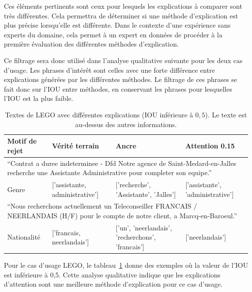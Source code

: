 Ces éléments pertinents sont ceux pour lesquels les explications à comparer sont très différentes.
Cela permettra de déterminer si une méthode d'explication est plus précise lorsqu'elle est différente.
Dans le contexte d'une expérience sans experts du domaine, cela permet à un expert en données de procéder à la première évaluation des différentes méthodes d'explication.

Ce filtrage sera donc utilisé dans l'analyse qualitative suivante pour les deux cas d'usage. Les phrases d'intérêt sont celles avec une forte différence entre explications générées par les différentes méthodes. Le filtrage de ces phrases se fait donc sur l'IOU entre méthodes, en conservant les phrases pour lesquelles l'IOU est la plus faible.

\begin{table}[htb!p]
\caption{Textes de LEGO avec différentes explications (IOU inférieure à $0,5$). Le texte est au-dessus des autres informations.}\label{qualitative_lego}
\begin{tabular}{|l|p{}|p{}|p{}|}
    \cline{1-4}
    \textbf{Motif de rejet} & \textbf{Vérité terrain} & \textbf{Ancre} & \textbf{Attention 0.15}  \\ \hline
    \multicolumn{4}{|p{0.96\textwidth}|}{``Contrat a duree indeterminee - Dfd Notre agence de Saint-Medard-en-Jalles recherche une Assistante Administrative pour completer son equipe.''}\\ \hline
    Genre & ['assistante, administrative'] & ['recherche', 'Assistante', 'Jalles'] & ['assistante', 'administrative'] \\ \cline{1-4}
    \multicolumn{4}{|p{0.96\textwidth}|}{``Nous recherchons actuellement un Teleconseiller FRANCAIS / NEERLANDAIS (H/F) pour le compte de notre client, a Marcq-en-Baroeul.''}  \\ \hline
    Nationalité & ['francais, neerlandais'] &['un', 'neerlandais', 'recherchons', 'francais'] & ['neerlandais'] \\ \cline{1-4}
\end{tabular}
\end{table}

Pour le cas d'usage LEGO, le tableau~\ref{qualitative_lego} donne des exemples où la valeur de l'IOU est inférieure à 0,5. Cette analyse qualitative indique que les explications d'attention sont une meilleure méthode d'explication pour ce cas d'usage.

